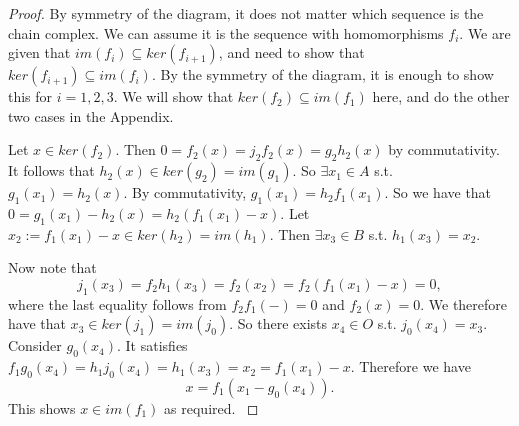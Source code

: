 \begin{proof}
By symmetry of the diagram, it does not matter which sequence is the chain complex. We can assume it is the sequence with homomorphisms $f_i$. We are given that $im(f_i)\subseteq ker(f_{i+1})$, and need to show that $ker(f_{i+1})\subseteq im(f_i)$. By the symmetry of the diagram, it is enough to show this for $i=1,2,3$. We will show that $ker(f_2)\subseteq im(f_1)$ here, and do the other two cases in the Appendix.

Let $x\in ker(f_2)$. Then $0=f_2(x)=j_2f_2(x)=g_2h_2(x)$ by commutativity. It follows that $h_2(x)\in ker(g_2)=im(g_1)$. So $\exists x_1\in A$ s.t. $g_1 (x_1)=h_2(x)$. By commutativity, $g_1(x_1)=h_2f_1 (x_1)$. So we have that $0=g_1 (x_1)-h_2(x)=h_2(f_1 (x_1)-x)$. Let $x_2:=f_1(x_1)-x\in ker(h_2)=im(h_1)$. Then $\exists x_3\in B$ s.t. $h_1(x_3)=x_2$.

Now note that $$j_1(x_3)=f_2h_1(x_3)=f_2(x_2)=f_2(f_1(x_1)-x)=0,$$
where the last equality follows from $f_2f_1(-)=0$ and $f_2(x)=0$. We therefore have that $x_3\in ker(j_1)=im(j_0)$. So there exists $x_4\in O$ s.t. $j_0(x_4)=x_3$. Consider $g_0(x_4).$ It satisfies $f_1g_0(x_4)=h_1j_0(x_4)=h_1(x_3)=x_2=f_1(x_1)-x$. Therefore we have
$$x=f_1(x_1-g_0(x_4)).$$
This shows $x\in im(f_1)$ as required.
\cite{Eilenberg}
\end{proof}
